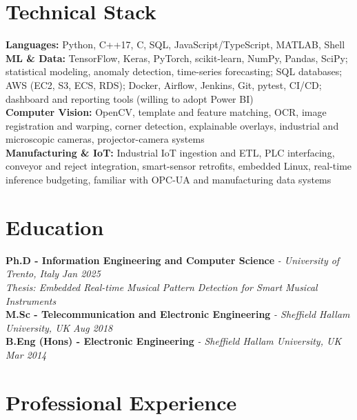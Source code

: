 \documentclass[11pt]{article}
\begin{document}
\section*{Technical Stack}

\textbf{Languages:} Python, C++17, C, SQL, JavaScript/TypeScript, MATLAB, Shell\\
\textbf{ML \& Data:} TensorFlow, Keras, PyTorch, scikit-learn, NumPy, Pandas, SciPy; statistical modeling, anomaly detection, time-series forecasting; SQL databases; AWS (EC2, S3, ECS, RDS); Docker, Airflow, Jenkins, Git, pytest, CI/CD; dashboard and reporting tools (willing to adopt Power BI)\\
\textbf{Computer Vision:} OpenCV, template and feature matching, OCR, image registration and warping, corner detection, explainable overlays, industrial and microscopic cameras, projector-camera systems\\
\textbf{Manufacturing \& IoT:} Industrial IoT ingestion and ETL, PLC interfacing, conveyor and reject integration, smart-sensor retrofits, embedded Linux, real-time inference budgeting, familiar with OPC-UA and manufacturing data systems

\section*{Education}
\textbf{Ph.D - Information Engineering and Computer Science} \textit{\small{ - University of Trento, Italy}} \hfill \textit{Jan 2025}\\[2pt]
\noindent\textit{\small Thesis: Embedded Real-time Musical Pattern Detection for Smart Musical Instruments}\\[3pt]
\noindent\textbf{M.Sc - Telecommunication and Electronic Engineering} \textit{\small{ - Sheffield Hallam University, UK}} \hfill \textit{Aug 2018}\\[3pt]
\noindent\textbf{B.Eng (Hons) - Electronic Engineering} \textit{\small{ - Sheffield Hallam University, UK}} \hfill \textit{Mar 2014}

\section*{Professional Experience}
\end{document}
